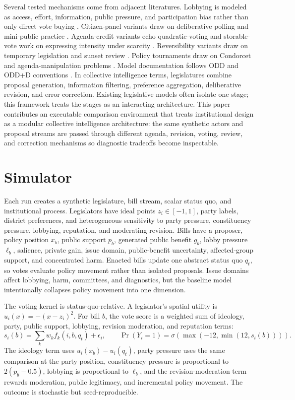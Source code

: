 \documentclass[manuscript]{acmart}
\begin{document}
Several tested mechanisms come from adjacent literatures. Lobbying is modeled as access, effort, information, public pressure, and participation bias rather than only direct vote buying \citep{AustenSmith1993,AustenSmith1995,HallDeardorff2006,HallWayman1990,deFigueiredoRichter2014,GilensPage2014}. Citizen-panel variants draw on deliberative polling and mini-public practice \citep{Fishkin2009,OECD2020}. Agenda-credit variants echo quadratic-voting and storable-vote work on expressing intensity under scarcity \citep{Casella2005,LalleyWeyl2018}. Reversibility variants draw on temporary legislation and sunset review \citep{Gersen2007,Ranchordas2014}. Policy tournaments draw on Condorcet and agenda-manipulation problems \citep{McKelvey1976,Tideman1987}. Model documentation follows ODD and ODD+D conventions \citep{Grimm2010,Muller2013}. In collective intelligence terms, legislatures combine proposal generation, information filtering, preference aggregation, deliberative revision, and error correction. Existing legislative models often isolate one stage; this framework treats the stages as an interacting architecture. This paper contributes an executable comparison environment that treats institutional design as a modular collective intelligence architecture: the same synthetic actors and proposal streams are passed through different agenda, revision, voting, review, and correction mechanisms so diagnostic tradeoffs become inspectable.

\section{Simulator}

Each run creates a synthetic legislature, bill stream, scalar status quo, and institutional process. Legislators have ideal points \(z_i\in[-1,1]\), party labels, district preferences, and heterogeneous sensitivity to party pressure, constituency pressure, lobbying, reputation, and moderating revision. Bills have a proposer, policy position \(x_b\), public support \(p_b\), generated public benefit \(g_b\), lobby pressure \(\ell_b\), salience, private gain, issue domain, public-benefit uncertainty, affected-group support, and concentrated harm. Enacted bills update one abstract status quo \(q_t\), so votes evaluate policy movement rather than isolated proposals. Issue domains affect lobbying, harm, committees, and diagnostics, but the baseline model intentionally collapses policy movement into one dimension.

The voting kernel is status-quo-relative. A legislator's spatial utility is \(u_i(x)=-(x-z_i)^2\). For bill \(b\), the vote score is a weighted sum of ideology, party, public support, lobbying, revision moderation, and reputation terms:
\[
s_i(b)=\sum_k w_k f_k(i,b,q_t)+\epsilon_i,\qquad
\Pr(Y_i=1)=\sigma(\max(-12,\min(12,s_i(b)))).
\]
The ideology term uses \(u_i(x_b)-u_i(q_t)\), party pressure uses the same comparison at the party position, constituency pressure is proportional to \(2(p_b-0.5)\), lobbying is proportional to \(\ell_b\), and the revision-moderation term rewards moderation, public legitimacy, and incremental policy movement. The outcome is stochastic but seed-reproducible.
\end{document}
